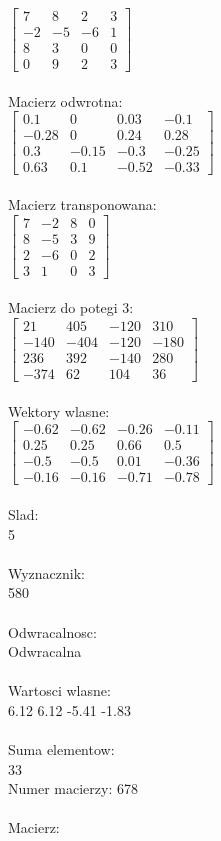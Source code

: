 \documentclass[a4paper,12pt]{article}
\begin{document}
$\begin{bmatrix} 7&8&2&3\\-2&-5&-6&1\\8&3&0&0\\0&9&2&3 \end{bmatrix}$
\\
\\
Macierz odwrotna:\\

$\begin{bmatrix} 0.1&0&0.03&-0.1\\-0.28&0&0.24&0.28\\0.3&-0.15&-0.3&-0.25\\0.63&0.1&-0.52&-0.33 \end{bmatrix}$
\\
\\
Macierz transponowana:\\

$\begin{bmatrix} 7&-2&8&0\\8&-5&3&9\\2&-6&0&2\\3&1&0&3 \end{bmatrix}$
\\
\\
Macierz do potegi 3:\\

$\begin{bmatrix} 21&405&-120&310\\-140&-404&-120&-180\\236&392&-140&280\\-374&62&104&36 \end{bmatrix}$
\\
\\
Wektory wlasne:\\

$\begin{bmatrix} -0.62&-0.62&-0.26&-0.11\\0.25&0.25&0.66&0.5\\-0.5&-0.5&0.01&-0.36\\-0.16&-0.16&-0.71&-0.78 \end{bmatrix}$
\\
\\
Slad:\\
5
\\
\\
Wyznacznik:\\
580
\\
\\
Odwracalnosc:\\
Odwracalna
\\
\\
Wartosci wlasne:\\
6.12 6.12 -5.41 -1.83
\\
\\
Suma elementow:\\
33
\\
\newpage
Numer macierzy:
678
\\
\\
Macierz:\\
\end{document}
